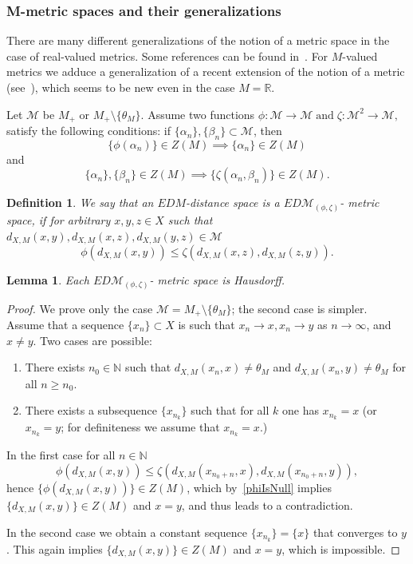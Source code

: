 \documentclass[12pt]{amsart}          %
\newtheorem{lemma}{Lemma}
\newtheorem{definition}{Definition}
\newcommand{\RR}{\mathbb R}
\newcommand{\NN}{\mathbb N}
\begin{document}
\subsubsection{M-metric spaces and their generalizations}\label{s::zetaMetricSpace}

There are many different generalizations of the notion of a metric space in the case of real-valued metrics. Some references can be found in~\cite{Jleli,Roldan, VillaMorales,JS2,Kucha}. For $M$-valued metrics we adduce a generalization of a recent extension of the notion of a metric (see~\cite{JS2,Kucha}), which seems to be new even in the case $M=\RR$.

Let $\mathcal{M}$ be $M_+$ or $M_+\setminus \{\theta_M\}$.
Assume two functions 
$\phi\colon \mathcal{M}\to  \mathcal{M}\;\text{and}\; \zeta\colon \mathcal{M}^2\to \mathcal{M},$ 
satisfy the following conditions: if  $\{\alpha_n\},\{ \beta_n\}\subset \mathcal{M}$, then
\begin{equation}\label{phiIsNull}
    \{\phi(\alpha_n)\}\in Z(M)\implies \{\alpha_n\}\in Z(M)
\end{equation}
and 
\begin{equation}\label{zetaIsNullSq}
    \{\alpha_n\},\{\beta_n\}\in Z(M) \implies  \{\zeta (\alpha_n,\beta_n)\}\in Z(M).
\end{equation}
\begin{definition}
We say that an $EDM$-distance space is a 
$ED\mathcal{M}_{(\phi,\zeta)}$- metric space, if for arbitrary $x,y,z\in X$ such that $d_{X,M}(x,y),d_{X,M}(x,z),d_{X,M}(y,z)\in \mathcal{M}$ 
\begin{equation}\label{phi_psi}
\phi (d_{X,M}(x,y))\le \zeta (d_{X,M}(x,z),d_{X,M}(z,y)).    
\end{equation}
\end{definition}
\begin{lemma}
Each $ED\mathcal{M}_{(\phi,\zeta)}$- metric space is Hausdorff.
\end{lemma}
\begin{proof} We prove only the case $\mathcal{M}=M_+\setminus \{ \theta_M\}$; the second case is simpler.
Assume that a sequence $\{ x_n\}\subset X$ is such that $x_n\to x, x_n\to y$ as $n\to\infty$, and $x\neq y$. Two cases are possible:
\begin{enumerate}
    \item There exists  $n_0\in \NN$  such that $d_{X,M}(x_n,x)\neq \theta_M$ and $d_{X,M}(x_n,y)\neq \theta_M$ for all  $n\ge n_0$.
    \item There exists a subsequence   $\{ x_{n_k}\}$ such that for all $k$ one has $x_{n_k}=x$ (or $x_{n_k}=y$; for definiteness we assume that $x_{n_k}=x$.)
\end{enumerate}
In the first case for all  $n\in\NN$
$$
\phi(d_{X,M}(x,y))\le \zeta(d_{X,M}(x_{n_0+n},x),d_{X,M}(x_{n_0+n},y)),
$$
 hence $\{\phi(d_{X,M}(x,y))\}\in Z(M)$, which by~\eqref{phiIsNull} implies $\{d_{X,M}(x,y)\}\in Z(M)$ and $x = y$, and thus leads to a contradiction.

In the second case we obtain a constant sequence $\{ x_{n_k}\}=\{ x\}$ that converges to $y$. This again implies $\{d_{X,M}(x,y)\}\in Z(M)$ and $x = y$, which is impossible.
\end{proof}
\end{document}
